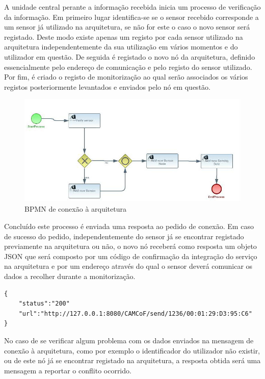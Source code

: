 A unidade central perante a informação recebida inicia um processo de verificação da informação. Em primeiro lugar identifica-se se o sensor recebido corresponde a um sensor já utilizado na arquitetura, se não for este o caso o novo sensor será registado. Deste modo existe apenas um registo por cada sensor utilizado na arquitetura independentemente da sua utilização em vários momentos e do utilizador em questão. De seguida é registado o novo nó da arquitetura, definido essencialmente pelo endereço de comunicação e pelo registo do sensor utilizado. Por fim, é criado o registo de monitorização ao qual serão associados os vários registos posteriormente levantados e enviados pelo nó em questão.

\begin{figure}[htb]
   \centering
   \includegraphics[scale=0.55]{Images/SaveSensingComponent.jpg}
   \caption{BPMN de conexão à arquitetura}
\end{figure}

Concluído este processo é enviada uma resposta ao pedido de conexão. Em caso de sucesso do pedido, independentemente do sensor já se encontrar registado previamente na arquitetura ou não, o novo nó receberá como resposta um objeto JSON que será composto por um código de confirmação da integração do serviço na arquitetura e por um endereço através do qual o sensor deverá comunicar os dados a recolher durante a monitorização.\\

\begin{lstlisting}[caption=Mensagem de sucesso em JSON]
{
	"status":"200"
	"url":"http://127.0.0.1:8080/CAMCoF/send/1236/00:01:29:D3:95:C6"
}
\end{lstlisting}

No caso de se verificar algum problema com os dados enviados na mensagem de conexão à arquitetura, como por exemplo o identificador do utilizador não existir, ou de este nó já se encontrar registado na arquitetura, a resposta obtida será uma mensagem a reportar o conflito ocorrido.\\

